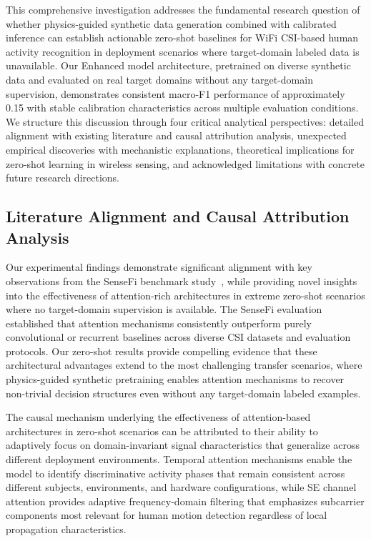 \documentclass[journal]{IEEEtran}
\begin{document}
This comprehensive investigation addresses the fundamental research question of whether physics-guided synthetic data generation combined with calibrated inference can establish actionable zero-shot baselines for WiFi CSI-based human activity recognition in deployment scenarios where target-domain labeled data is unavailable. Our Enhanced model architecture, pretrained on diverse synthetic data and evaluated on real target domains without any target-domain supervision, demonstrates consistent macro-F1 performance of approximately 0.15 with stable calibration characteristics across multiple evaluation conditions. We structure this discussion through four critical analytical perspectives: detailed alignment with existing literature and causal attribution analysis, unexpected empirical discoveries with mechanistic explanations, theoretical implications for zero-shot learning in wireless sensing, and acknowledged limitations with concrete future research directions.

\subsection{Literature Alignment and Causal Attribution Analysis}

Our experimental findings demonstrate significant alignment with key observations from the SenseFi benchmark study~\cite{yang2023sensefi}, while providing novel insights into the effectiveness of attention-rich architectures in extreme zero-shot scenarios where no target-domain supervision is available. The SenseFi evaluation established that attention mechanisms consistently outperform purely convolutional or recurrent baselines across diverse CSI datasets and evaluation protocols. Our zero-shot results provide compelling evidence that these architectural advantages extend to the most challenging transfer scenarios, where physics-guided synthetic pretraining enables attention mechanisms to recover non-trivial decision structures even without any target-domain labeled examples.

The causal mechanism underlying the effectiveness of attention-based architectures in zero-shot scenarios can be attributed to their ability to adaptively focus on domain-invariant signal characteristics that generalize across different deployment environments. Temporal attention mechanisms enable the model to identify discriminative activity phases that remain consistent across different subjects, environments, and hardware configurations, while SE channel attention provides adaptive frequency-domain filtering that emphasizes subcarrier components most relevant for human motion detection regardless of local propagation characteristics.
\end{document}
